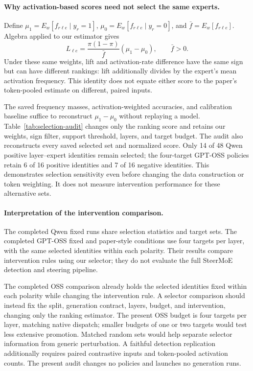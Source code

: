 \paragraph{Why activation-based scores need not select the same experts.}
Define $\mu_1=E_w[f_{r\ell e}\mid y_r=1]$,
$\mu_0=E_w[f_{r\ell e}\mid y_r=0]$, and
$\bar f=E_w[f_{r\ell e}]$. Algebra applied to our estimator gives
\begin{equation}
L_{\ell e}=\frac{\pi(1-\pi)}{\bar f}(\mu_1-\mu_0),\qquad \bar f>0.
\end{equation}
Under these same weights, lift and activation-rate difference have the same
sign but can have different rankings: lift additionally divides by the
expert's mean activation frequency. This identity does not equate either
score to the paper's token-pooled estimate on different, paired inputs.

The saved frequency masses, activation-weighted accuracies, and calibration
baseline suffice to reconstruct $\mu_1-\mu_0$ without replaying a model.
Table~\ref{tab:selection-audit} changes only the ranking score and retains
our weights, sign filter, support threshold, layers, and target budget.
The audit also reconstructs every saved selected set and normalized score.
Only 14 of 48 Qwen positive layer--expert identities remain selected;
the four-target GPT-OSS policies retain 6 of 16 positive identities and
7 of 16 negative identities.
This demonstrates selection sensitivity even before changing the data
construction or token weighting. It does not measure intervention performance
for these alternative sets.



\paragraph{Interpretation of the intervention comparison.}
The completed Qwen fixed runs share selection statistics and target sets.
The completed GPT-OSS fixed and paper-style conditions use four targets
per layer, with the same selected identities within each polarity.
Their results compare intervention rules using our selector; they do not
evaluate the full SteerMoE detection and steering pipeline.

The completed OSS comparison already holds the selected identities fixed
within each polarity while changing the intervention rule. A selector
comparison should instead fix the split, generation contract, layers, budget,
and intervention, changing only the ranking estimator. The present OSS
budget is four targets per layer, matching native dispatch; smaller budgets
of one or two targets would test less extensive promotion. Matched random
sets would help separate selector information from generic perturbation. A faithful detection replication additionally requires
paired contrastive inputs and token-pooled activation counts. The present
audit changes no policies and launches no generation runs.
